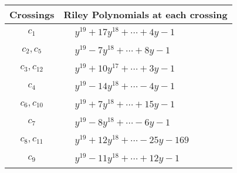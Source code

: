 \documentclass[1p]{elsarticle_modified}
\theoremstyle{definition}
\begin{document}
\begin{tabular}{m{50pt}|m{274pt}}
Crossings & \hspace{64pt}Riley Polynomials at each crossing \\
\hline $$\begin{aligned}c_{1}\end{aligned}$$&$\begin{aligned}
&y^{19}+17 y^{18}+\cdots+4 y-1
\end{aligned}$\\
\hline $$\begin{aligned}c_{2},c_{5}\end{aligned}$$&$\begin{aligned}
&y^{19}-7 y^{18}+\cdots+8 y-1
\end{aligned}$\\
\hline $$\begin{aligned}c_{3},c_{12}\end{aligned}$$&$\begin{aligned}
&y^{19}+10 y^{17}+\cdots+3 y-1
\end{aligned}$\\
\hline $$\begin{aligned}c_{4}\end{aligned}$$&$\begin{aligned}
&y^{19}-14 y^{18}+\cdots-4 y-1
\end{aligned}$\\
\hline $$\begin{aligned}c_{6},c_{10}\end{aligned}$$&$\begin{aligned}
&y^{19}+7 y^{18}+\cdots+15 y-1
\end{aligned}$\\
\hline $$\begin{aligned}c_{7}\end{aligned}$$&$\begin{aligned}
&y^{19}-8 y^{18}+\cdots-6 y-1
\end{aligned}$\\
\hline $$\begin{aligned}c_{8},c_{11}\end{aligned}$$&$\begin{aligned}
&y^{19}+12 y^{18}+\cdots-25 y-169
\end{aligned}$\\
\hline $$\begin{aligned}c_{9}\end{aligned}$$&$\begin{aligned}
&y^{19}-11 y^{18}+\cdots+12 y-1
\end{aligned}$\\
\hline
\end{tabular}\\~\\
\end{document}
